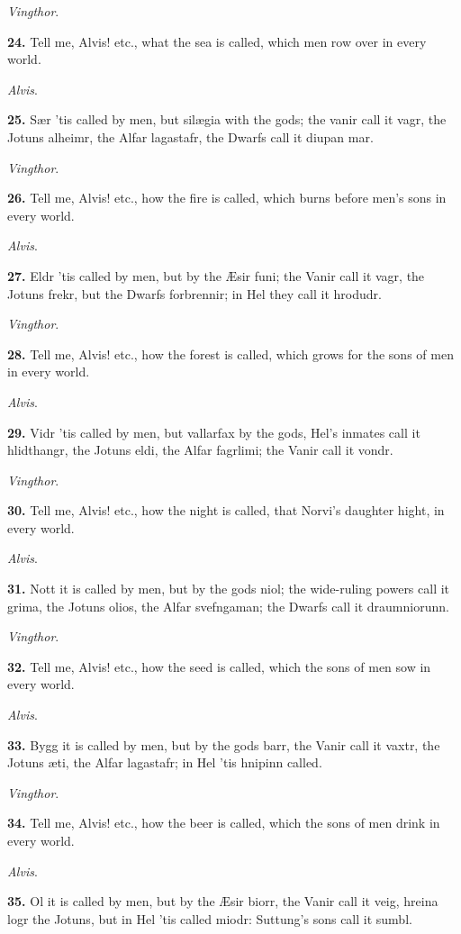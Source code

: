 \emph{Vingthor}.

\textbf{24.} Tell me, Alvis! etc., what the sea is called, which men row over
in every world.

\emph{Alvis}.

\textbf{25.} Sær 'tis called by men, but silægia with the gods; the vanir
call it vagr, the Jotuns alheimr, the Alfar lagastafr, the Dwarfs call
it diupan mar.

\emph{Vingthor}.

\textbf{26.} Tell me, Alvis! etc., how the fire is called, which burns before
men's sons in every world.

\emph{Alvis}.

\textbf{27.} Eldr 'tis called by men, but by the Æsir funi; the Vanir call it
vagr, the Jotuns frekr, but the Dwarfs forbrennir; in Hel they call it
hrodudr.

\emph{Vingthor}.

\textbf{28.} Tell me, Alvis! etc., how the forest is called, which grows for
the sons of men in every world.

\emph{Alvis}.

\textbf{29.} Vidr 'tis called by men, but vallarfax by the gods, Hel's
inmates call it hlidthangr, the Jotuns eldi, the Alfar fagrlimi; the
Vanir call it vondr.

\emph{Vingthor}.

\textbf{30.} Tell me, Alvis! etc., how the night is called, that Norvi's
daughter hight, in every world.

\emph{Alvis}.

\textbf{31.} Nott it is called by men, but by the gods niol; the wide-ruling
powers call it grima, the Jotuns olios, the Alfar svefngaman; the
Dwarfs call it draumniorunn.

\emph{Vingthor}.

\textbf{32.} Tell me, Alvis! etc., how the seed is called, which the sons of
men sow in every world.

\emph{Alvis}.

\textbf{33.} Bygg it is called by men, but by the gods barr, the Vanir call
it vaxtr, the Jotuns æti, the Alfar lagastafr; in Hel 'tis hnipinn
called.

\emph{Vingthor}.

\textbf{34.} Tell me, Alvis! etc., how the beer is called, which the sons of
men drink in every world.

\emph{Alvis}.

\textbf{35.} Ol it is called by men, but by the Æsir biorr, the Vanir call it
veig, hreina logr the Jotuns, but in Hel 'tis called miodr: Suttung's
sons call it sumbl.

